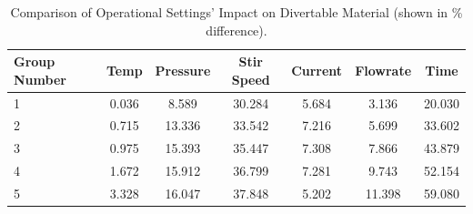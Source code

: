 \begin{table}[h]
	\centering
	\begin{tabularx}{\linewidth}{lcccccc}
		\hline
		\textbf{Group Number} & \textbf{Temp} & \textbf{Pressure} & \textbf{Stir Speed} & \textbf{Current}
		& \textbf{Flowrate} & \textbf{Time} \\
		\hline \hline
		1 & 0.036 & 8.589 & 30.284 & 5.684 & 3.136 & 20.030 \\ \hline
		2 & 0.715 & 13.336 & 33.542 & 7.216 & 5.699 & 33.602 \\ \hline
		3 & 0.975 & 15.393 & 35.447 & 7.308 & 7.866 & 43.879 \\ 
		4 & 1.672 & 15.912 & 36.799 & 7.281 & 9.743 & 52.154 \\ \hline
		5 & 3.328 & 16.047 & 37.848 & 5.202 & 11.398 & 59.080 \\ \hline
	\end{tabularx}
	\caption {Comparison of Operational Settings' Impact on Divertable Material (shown in
		\% difference).}
	\label {tab:compare}
\end{table}